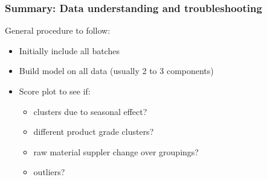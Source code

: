 
\begin{frame}\frametitle{Summary: Data understanding and troubleshooting}
	
General procedure to follow:	

\begin{itemize}
	\item	Initially include all batches
	
	\item	Build model on all data (usually 2 to 3 components)
	
	\item	Score plot to see if: \hfill {}
	
			\begin{itemize}
				\item	clusters due to seasonal effect?
				
				\item	different product grade clusters?
				
				\item	raw material suppler change over groupings?
				
				\item	outliers?
			\end{itemize}
\end{itemize}

\end{frame}